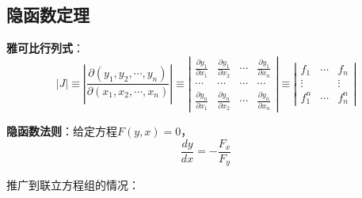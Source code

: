 \documentclass[12pt, a4paper, oneside]{article}
\begin{document}
\begin{CJK*}{UTF8}{gbsn}
%
\subsection{隐函数定理}
\noindent
\textbf{雅可比行列式}：
$$
|J| \equiv\left|\frac{\partial\left(y_{1}, y_{2}, \cdots, y_{n}\right)}{\partial\left(x_{1}, x_{2}, \cdots, x_{n}\right)}\right| \equiv\left|\begin{array}{cccc}\frac{\partial y_{1}}{\partial x_{1}} & \frac{\partial y_{1}}{\partial x_{2}} & \cdots & \frac{\partial y_{1}}{\partial x_{n}} \\ \cdots &\cdots &\cdots &\cdots  \\ \frac{\partial y_{n}}{\partial x_{1}} & \frac{\partial y_{n}}{\partial x_{2}} & \cdots & \frac{\partial y_{n}}{\partial x_{n}}\end{array}\right| \equiv\left|\begin{array}{ccc}f_{1} & \cdots & f_{n} \\ \vdots & & \vdots \\ f_{1}^{n} & \cdots & f_{n}^{n}\end{array}\right| 
$$

\noindent\textbf{隐函数法则}：给定方程$F(y, x)=0$，
$$\frac{dy}{dx}=-\frac{F_x}{F_y}$$

推广到联立方程组的情况：


\end{CJK*}
\end{document}
